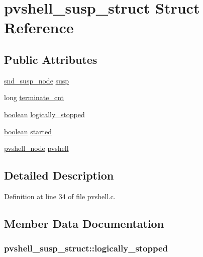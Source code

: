\hypertarget{structpvshell__susp__struct}{}\section{pvshell\+\_\+susp\+\_\+struct Struct Reference}
\label{structpvshell__susp__struct}
\subsection*{Public Attributes}
\begin{DoxyCompactItemize}
\item 
\hyperlink{sound_8h_a6b268203688a934bd798ceb55f85d4c0}{snd\+\_\+susp\+\_\+node} \hyperlink{structpvshell__susp__struct_a2cf1ad10ce8f5582909f3c4cda32ccaa}{susp}
\item 
long \hyperlink{structpvshell__susp__struct_a3d7bdd738c051e884f5dc85ff5d9f416}{terminate\+\_\+cnt}
\item 
\hyperlink{cext_8h_a7670a4e8a07d9ebb00411948b0bbf86d}{boolean} \hyperlink{structpvshell__susp__struct_abdfea160683cd9709ac1e676845f8631}{logically\+\_\+stopped}
\item 
\hyperlink{cext_8h_a7670a4e8a07d9ebb00411948b0bbf86d}{boolean} \hyperlink{structpvshell__susp__struct_a6621d211a3d9aa94d87af5b1067400c4}{started}
\item 
\hyperlink{pvshell_8h_aa82c0d37f9bf23d98d3295259d5294b4}{pvshell\+\_\+node} \hyperlink{structpvshell__susp__struct_ae778b93e3dd87839934123039cf1e7ab}{pvshell}
\end{DoxyCompactItemize}


\subsection{Detailed Description}


Definition at line 34 of file pvshell.\+c.



\subsection{Member Data Documentation}
\subsubsection[{\texorpdfstring{logically\+\_\+stopped}{logically_stopped}}]{ pvshell\+\_\+susp\+\_\+struct\+::logically\+\_\+stopped}\hypertarget{structpvshell__susp__struct_abdfea160683cd9709ac1e676845f8631}{}\label{structpvshell__susp__struct_abdfea160683cd9709ac1e676845f8631}


